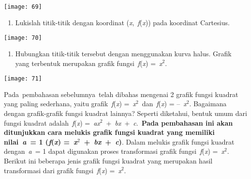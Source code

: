 \documentclass[11pt,fleqn]{book} %
\begin{document}
\begin{myEnumerate}
\begin{itemize}
\begin{center}
\noindent \texttt{[image: 69]}\textbf{}
\end{center}

\noindent \textbf{}

\noindent \textbf{}

\noindent \textbf{}

\noindent \textbf{}

\noindent \textbf{}

\noindent \textbf{}

\noindent \textbf{}

\begin{enumerate}
\item \textbf{ }Lukislah titik-titik dengan koordinat (\textit{x},~\textit{f}(\textit{x})) pada koordinat Cartesius.\textbf{}
\end{enumerate}

\begin{center}
\noindent \texttt{[image: 70]}\textbf{}
\end{center}

\begin{enumerate}
\item \textbf{ }Hubungkan titik-titik tersebut dengan menggunakan kurva halus. Grafik yang terbentuk merupakan grafik fungsi~\textit{f}(\textit{x}) =~\textit{x}${}^{2}$.\textbf{}
\end{enumerate}

\begin{center}
\noindent \texttt{[image: 71]}\textbf{}
\end{center}

Pada~pembahasan sebelumnya~telah dibahas mengenai 2 grafik fungsi kuadrat yang paling sederhana, yaitu grafik~\textit{f}(\textit{x}) =~\textit{x}${}^{2}$~dan~\textit{f}(\textit{x}) = --~\textit{x}${}^{2}$. Bagaimana dengan grafik-grafik fungsi kuadrat lainnya? Seperti diketahui, bentuk umum dari fungsi kuadrat adalah~\textit{f}(\textit{x}) =~\textit{ax}${}^{2}$~+~\textit{bx}~+~\textit{c}.~\textbf{Pada pembahasan ini akan ditunjukkan cara melukis grafik fungsi kuadrat yang memiliki nilai~\textit{a}~= 1 (\textit{f}(\textit{x}) =~\textit{x}${}^{2}$~+~\textit{bx}~+~\textit{c})}. Dalam melukis grafik fungsi kuadrat dengan~\textit{a}~= 1 dapat digunakan proses transformasi grafik fungsi~\textit{f}(\textit{x}) =~\textit{x}${}^{2}$. Berikut ini beberapa jenis grafik fungsi kuadrat yang merupakan hasil transformasi dari grafik fungsi~\textit{f}(\textit{x}) =~\textit{x}${}^{2}$.


\end{itemize}
\end{myEnumerate}
\end{document}
